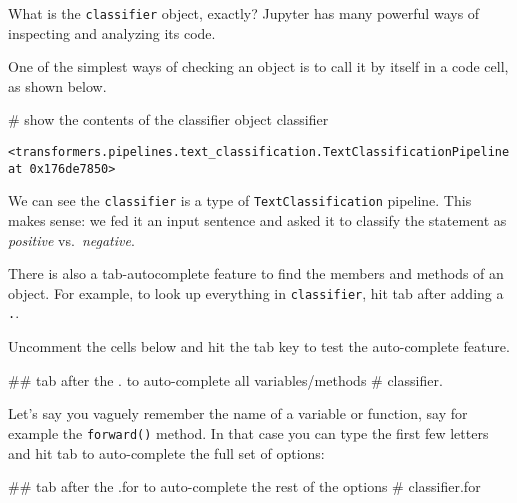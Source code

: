 \documentclass[
  letterpaper,
  DIV=11,
  numbers=noendperiod]{scrartcl}
\newenvironment{Shaded}{\begin{snugshade}}{\end{snugshade}}
\newcommand{\CommentTok}[1]{\textcolor[rgb]{0.37,0.37,0.37}{#1}}
\newcommand{\NormalTok}[1]{\textcolor[rgb]{0.00,0.23,0.31}{#1}}
\begin{document}
What is the \texttt{classifier} object, exactly? Jupyter has many
powerful ways of inspecting and analyzing its code.

One of the simplest ways of checking an object is to call it by itself
in a code cell, as shown below.

\begin{Shaded}
\begin{Highlighting}[]
\CommentTok{\# show the contents of the \textasciigrave{}classifier\textasciigrave{} object}
\NormalTok{classifier}
\end{Highlighting}
\end{Shaded}

\begin{verbatim}
<transformers.pipelines.text_classification.TextClassificationPipeline at 0x176de7850>
\end{verbatim}

We can see the \texttt{classifier} is a type of
\texttt{TextClassification} pipeline. This makes sense: we fed it an
input sentence and asked it to classify the statement as \emph{positive}
vs.~\emph{negative}.

There is also a tab-autocomplete feature to find the members and methods
of an object. For example, to look up everything in \texttt{classifier},
hit tab after adding a \texttt{.}.

Uncomment the cells below and hit the tab key to test the auto-complete
feature.

\begin{Shaded}
\begin{Highlighting}[]
\CommentTok{\#\# tab after the \textasciigrave{}.\textasciigrave{} to auto{-}complete all variables/methods}
\CommentTok{\# classifier.}
\end{Highlighting}
\end{Shaded}

Let's say you vaguely remember the name of a variable or function, say
for example the \texttt{forward()} method. In that case you can type the
first few letters and hit tab to auto-complete the full set of options:

\begin{Shaded}
\begin{Highlighting}[]
\CommentTok{\#\# tab after the \textasciigrave{}.for\textasciigrave{} to auto{-}complete the rest of the options}
\CommentTok{\# classifier.for}
\end{Highlighting}
\end{Shaded}
\end{document}
